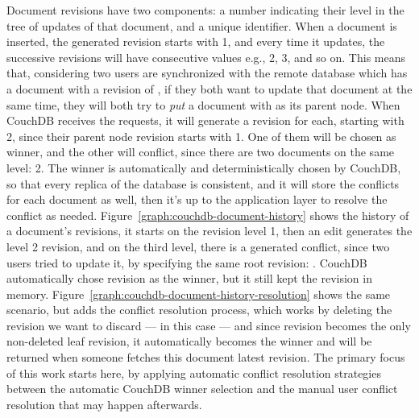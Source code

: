 Document revisions have two components: a number indicating their level in the tree of updates of that document, and a unique identifier. When a document is inserted, the generated revision starts with 1, and every time it updates, the successive revisions will have consecutive values e.g., 2, 3, and so on. This means that, considering two users are synchronized with the remote database which has a document with a revision of , if they both want to update that document at the same time, they will both try to \textit{put} a document with  as its parent node. When CouchDB receives the requests, it will generate a revision for each, starting with 2, since their parent node revision starts with 1. One of them will be chosen as winner, and the other will conflict, since there are two documents on the same level: 2. The winner is automatically and deterministically chosen by CouchDB, so that every replica of the database is consistent, and it will store the conflicts for each document as well, then it's up to the application layer to resolve the conflict as needed. Figure~\ref{graph:couchdb-document-history} shows the history of a document's revisions, it starts on the revision level 1, then an edit generates the level 2 revision, and on the third level, there is a generated conflict, since two users tried to update it, by specifying the same root revision: . CouchDB automatically chose revision  as the winner, but it still kept the  revision in memory. Figure~\ref{graph:couchdb-document-history-resolution} shows the same scenario, but adds the conflict resolution process, which works by deleting the revision we want to discard ---  in this case --- and since revision  becomes the only non-deleted leaf revision, it automatically becomes the winner and will be returned when someone fetches this document latest revision. The primary focus of this work starts here, by applying automatic conflict resolution strategies between the automatic CouchDB winner selection and the manual user conflict resolution that may happen afterwards.

